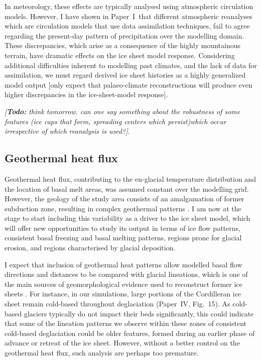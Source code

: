 \documentclass{article}
\newcommand{\todo}[1]{\emph{[\textbf{Todo:} #1]}}
\newcommand{\CCLI}[0]{Paper~I}      %
\newcommand{\CCYC}[0]{Paper~IV}     %
\begin{document}
In meteorology, these effects are typically analysed using atmospheric
circulation models. However, I have shown in \CCLI\ that different atmospheric
reanalyses which are circulation models that use data assimilation techniques,
fail to agree regarding the present-day pattern of precipitation over the
modelling domain. These discrepancies, which arise as a consequence of the
highly mountainous terrain, have dramatic effects on the ice sheet model
response. Considering additional difficulties inherent to modelling past
climates, and the lack of data for assimilation, we must regard derived ice
sheet histories as a highly generalized model output [only expect that
palaeo-climate reconstructions will produce even higher discrepancies in the
ice-sheet-model response].

\todo{think tomorrow. can one say something about the robustness of some
      features (ice caps that form, spreading centers which persist)which occur
      irrespective of which reanalysis is used?}.


\subsection{Geothermal heat flux}

Geothermal heat flux, contributing to the en-glacial temperature distribution
and the location of basal melt areas, was assumed constant over the modelling
grid. However, the geology of the study area consists of an amalgamation of
former subduction zone, resulting in complex geothermal patterns
\citep{Blackwell.Richards.2004}. I am now at the stage to start including this
variability as a driver to the ice sheet model, which will offer new
opportunities to study its output in terms of ice flow patterns, consistent
basal freezing and basal melting patterns, regions prone for glacial erosion,
and regions characterised by glacial deposition.

I expect that inclusion of geothermal heat patterns allow modelled basal flow
directions and distances to be compared with glacial lineations, which is one
of the main sources of geomorphological evidence used to reconstruct former ice
sheets \citep{Boulton.Clark.1990, Kleman.etal.1997, Kleman.etal.2010}. For
instance, in our simulations, large portions of the Cordilleran ice sheet
remain cold-based throughout deglaciation (\CCYC, Fig.~15). As cold-based
glaciers typically do not impact their beds significantly, this could indicate
that some of the lineation patterns we observe within these zones of consistent
cold-based deglaciation could be older features, formed during an earlier phase
of advance or retreat of the ice sheet. However, without a better control on
the geothermal heat flux, such analysis are perhaps too premature.
\end{document}
